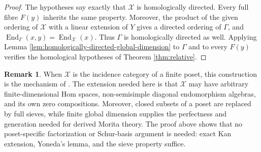\documentclass[12pt,a4paper,english,reqno]{amsart}
\theoremstyle{plain}
\theoremstyle{definition}
\newtheorem{remark}[theorem]{Remark}
\newcommand{\End}{\operatorname{End}}
\newcommand{\X}{\mathcal X}
\newcommand{\G}{\Gamma}
\begin{document}
\begin{proof}
The hypotheses say exactly that $\X$ is homologically directed.  Every full
fibre $F(y)$ inherits the same property.  Moreover, the product of the
given ordering of $\X$ with a linear extension of $Y$ gives a directed
ordering of $\G$, and $\End_{\G}(x,y)=\End_{\X}(x)$.
Thus $\G$ is homologically directed as well.  Applying
Lemma \ref{lem:homologically-directed-global-dimension} to $\G$ and to every
$F(y)$ verifies the homological hypotheses of Theorem \ref{thm:relative}.
\end{proof}

\begin{remark}
When $\X$ is the incidence category of a finite poset, this construction is
the mechanism of \cite[Theorem~3.1]{CLR}.  The extension needed here is that
$\X$ may have arbitrary finite-dimensional Hom spaces, non-semisimple
diagonal endomorphism algebras, and its own zero compositions.  Moreover,
closed subsets of a poset are replaced by full sieves, while finite global
dimension supplies the perfectness and generation needed for derived
Morita theory.  The proof above shows that no poset-specific factorization
or Schur-basis argument is needed: exact Kan extension, Yoneda's lemma, and
the sieve property suffice.
\end{remark}
\end{document}
